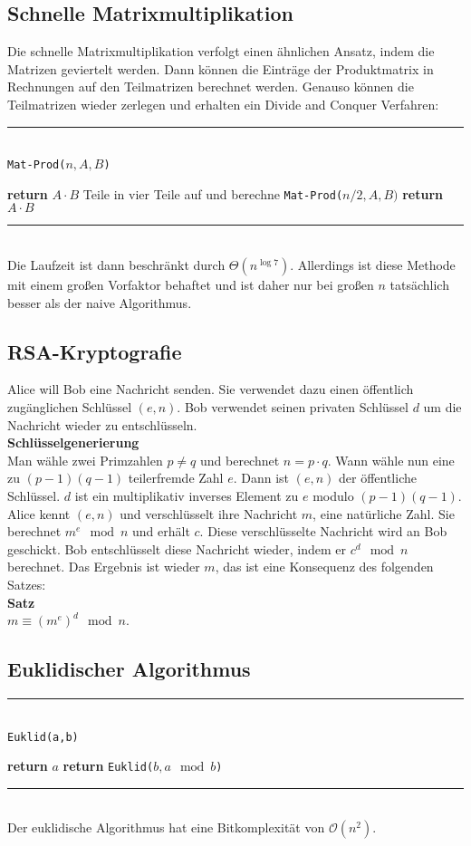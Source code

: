 \documentclass[a4paper, 12pt]{article}
\begin{document}
	\subsection{Schnelle Matrixmultiplikation}
	Die schnelle Matrixmultiplikation verfolgt einen ähnlichen Ansatz, indem die Matrizen geviertelt werden. Dann können die Einträge der Produktmatrix in Rechnungen auf den Teilmatrizen berechnet werden. Genauso können die Teilmatrizen wieder zerlegen und erhalten ein Divide and Conquer Verfahren: 
	\par\noindent\rule{\textwidth}{0.4pt}\\
	\texttt{Mat-Prod($n,A,B$)}
	\begin{algorithmic}[1]
		\State \textbf{return} $A\cdot B$
		\Else
		\State Teile in vier Teile auf und berechne \texttt{Mat-Prod($n/2, A, B)$}
		\EndIf
		\State \textbf{return} $A\cdot B$
	\end{algorithmic}
	\par\noindent\rule{\textwidth}{0.4pt}\\
	Die Laufzeit ist dann beschränkt durch $\Theta(n^{\log 7})$. Allerdings ist diese Methode mit einem großen Vorfaktor behaftet und ist daher nur bei großen $n$ tatsächlich besser als der naive Algorithmus.
	\subsection{RSA-Kryptografie}
	Alice will Bob eine Nachricht senden. Sie verwendet dazu einen öffentlich zugänglichen Schlüssel $(e,n)$. Bob verwendet seinen privaten Schlüssel $d$ um die Nachricht wieder zu entschlüsseln.\\
	\textbf{Schlüsselgenerierung}\\
	Man wähle zwei Primzahlen $p \neq q$ und berechnet $n = p \cdot q$. Wann wähle nun eine zu $(p-1)(q-1)$ teilerfremde Zahl $e$. Dann ist $(e,n)$ der öffentliche Schlüssel. $d$ ist ein multiplikativ inverses Element zu $e$ modulo $(p-1)(q-1)$.\\
	Alice kennt $(e,n)$ und verschlüsselt ihre Nachricht $m$, eine natürliche Zahl. Sie berechnet $m^e \mod n$ und erhält $c$. Diese verschlüsselte Nachricht wird an Bob geschickt. Bob entschlüsselt diese Nachricht wieder, indem er $c^d \mod n$ berechnet. Das Ergebnis ist wieder $m$, das ist eine Konsequenz des folgenden Satzes: \\
	\textbf{Satz}\\
	$m \equiv (m^e)^d \mod n$.\\
	\subsection{Euklidischer Algorithmus}
	\par\noindent\rule{\textwidth}{0.4pt}\\
	\texttt{Euklid(a,b)}
	\begin{algorithmic}[1]
		\State \textbf{return} $a$
		\Else
		\State \textbf{return} \texttt{Euklid($b, a \mod b$)}
		\EndIf
	\end{algorithmic}
	\par\noindent\rule{\textwidth}{0.4pt}\\
	Der euklidische Algorithmus hat eine Bitkomplexität von $\mathcal{O}(n^2)$.\\
\end{document}
